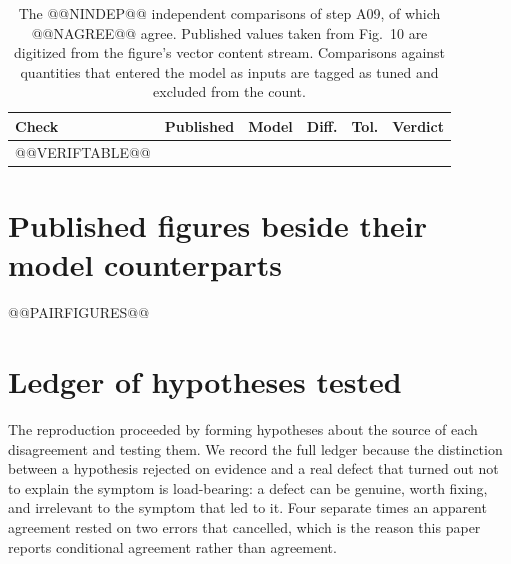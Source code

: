 \documentclass[11pt,a4paper]{article}
\begin{document}
\begin{table}[htbp]
\centering
\scriptsize
\begin{tabular}{p{5.4cm}rrrrl}
\toprule
\textbf{Check} & \textbf{Published} & \textbf{Model} & \textbf{Diff.} & \textbf{Tol.} & \textbf{Verdict} \\
\midrule
@@VERIFTABLE@@
\bottomrule
\end{tabular}
\caption{The @@NINDEP@@ independent comparisons of step A09, of which @@NAGREE@@ agree. Published
values taken from Fig.~10 are digitized from the figure's vector content stream. Comparisons
against quantities that entered the model as inputs are tagged as tuned and excluded from the
count.}
\label{tab:verif}
\end{table}

\section{Published figures beside their model counterparts}
\label{app:pairs}

@@PAIRFIGURES@@

\section{Ledger of hypotheses tested}
\label{app:ledger}

The reproduction proceeded by forming hypotheses about the source of each disagreement and testing
them. We record the full ledger because the distinction between a hypothesis rejected on evidence
and a real defect that turned out not to explain the symptom is load-bearing: a defect can be
genuine, worth fixing, and irrelevant to the symptom that led to it. Four separate times an
apparent agreement rested on two errors that cancelled, which is the reason this paper reports
conditional agreement rather than agreement.
\end{document}
